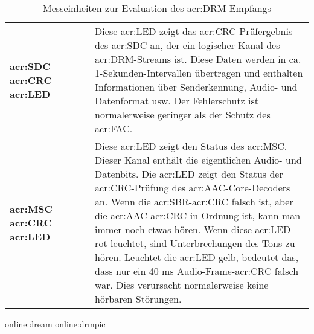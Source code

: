 \begin{table}[h]
\begin{center}
\begin{tabular}{p{0.28\linewidth}  p{0.72\linewidth}}
			\textbf{\gls{acr:SDC} \gls{acr:CRC} \gls{acr:LED}} & 	Diese \gls{acr:LED} zeigt das \gls{acr:CRC}-Prüfergebnis des \gls{acr:SDC} an, der ein logischer Kanal des \gls{acr:DRM}-Streams ist. Diese Daten werden in ca. 1-Sekunden-Intervallen übertragen und enthalten Informationen über Senderkennung, Audio- und Datenformat usw. Der Fehlerschutz ist normalerweise geringer als der Schutz des \gls{acr:FAC}. \\
			
			\textbf{\gls{acr:MSC} \gls{acr:CRC} \gls{acr:LED}} & Diese \gls{acr:LED} zeigt den Status des \gls{acr:MSC}. Dieser Kanal enthält die eigentlichen Audio- und Datenbits. Die \gls{acr:LED} zeigt den Status der \gls{acr:CRC}-Prüfung des \gls{acr:AAC}-Core-Decoders an.  Wenn die \gls{acr:SBR}-\gls{acr:CRC} falsch ist, aber die \gls{acr:AAC}-\gls{acr:CRC} in Ordnung ist, kann man immer noch etwas hören. Wenn diese \gls{acr:LED} rot leuchtet, sind Unterbrechungen des Tons zu hören. Leuchtet die \gls{acr:LED} gelb, bedeutet das, dass nur ein 40 ms Audio-Frame-\gls{acr:CRC} falsch war. Dies verursacht normalerweise keine hörbaren Störungen.\\
			\bottomrule
		\end{tabular}
		\caption{Messeinheiten zur Evaluation des \gls{acr:DRM}-Empfangs}
		\gls{online:dream}
		\label{tab:drmmess}\gls{online:drmpic}
	\end{center}
\end{table}


